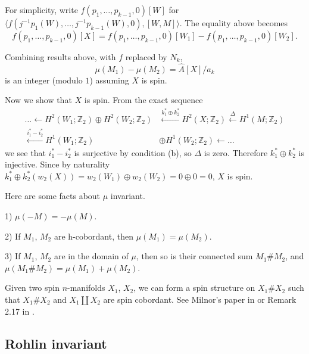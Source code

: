 \documentclass[twoside]{article}
\begin{document}
{	For simplicity, write $f\left(p_{1}, \ldots, p_{k-1}, 0\right)\left[W\right]$ for $\langle f\left(j^{-1}p_{1}(W), \ldots, j^{-1}p_{k-1}(W), 0\right),\left[W,M\right]\rangle $. The equality above becomes
	\[
	f\left(p_{1}, \ldots, p_{k-1}, 0\right)[X] = f\left(p_{1}, \ldots, p_{k-1}, 0\right)\left[W_{1}\right]-f\left(p_{1}, \ldots, p_{k-1}, 0\right)\left[W_{2}\right]. 
	\]
	
	Combining results above, with $f$ replaced by $N_k$, 
	\[
	\mu(M_1)-\mu(M_2) = \widehat{A}[X]/a_k 
	\]
	is an integer (modulo $1$) assuming $X$ is spin. 
	
	Now we show that $X$ is spin. From the exact sequence
	\begin{align*}
	\dots   \leftarrow H^{2}\left(W_{1} ; \mathbb{Z}_{2}\right)  \oplus  H^{2}\left(W_{2} ; \mathbb{Z}_{2}\right)& \stackrel{k_{1}^{*}  \oplus  k_{2}^{*}}{\leftarrow} {H^{2}}\left(X ; \mathbb{Z}_{2}\right) \stackrel{\Delta}{\leftarrow}{H}^{1}\left(M ; \mathbb{Z}_{2}\right) \\
	\stackrel{i_{1}^{*} - i_{2}^{*}}{\leftarrow}H^{1}\left(W_{1} ; \mathbb{Z}_{2}\right) & \oplus  H^{1}\left(W_{2} ; \mathbb{Z}_{2}\right)\leftarrow  \dots  
	\end{align*}
	we see that $i_{1}^{*} - i_{2}^{*}$ is surjective by condition (b), so $\Delta$ is zero. Therefore $k_{1}^{*}  \oplus  k_{2}^{*}$ is injective. Since by naturality $k_{1}^{*}  \oplus  k_{2}^{*}(w_2(X)) = w_2(W_1) \oplus  w_2(W_2) = 0 \oplus  0 = 0$, $X$ is spin. \qedhere}

Here are some facts about $\mu$ invariant. 

\begin{prop}
	
	1) $\mu(-M) = -\mu(M)$. 
	
	2) If $M_1$, $M_2$ are h-cobordant, then $\mu(M_1) = \mu(M_2)$. 
	
	3) If $M_1$, $M_2$ are in the domain of $\mu$, then so is their connected sum $M_1 \#  M_2$, and $\mu(M_1 \#  M_2) = \mu(M_1) + \mu(M_2)$. 
\end{prop}

Given two spin $n$-manifolds $X_1$, $X_2$, we can form a spin structure on $X_1 \#  X_2$ such that $X_1 \#  X_2$ and $X_1\coprod X_2$ are spin cobordant. See Milnor's paper in \cite{milnorspin} or Remark 2.17 in \cite{lawsonspin}. 







\subsection{Rohlin invariant}
\end{document}
